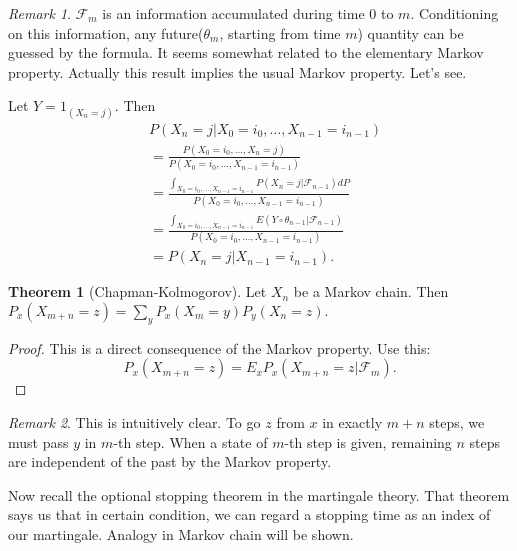 \documentclass{memoir}
\theoremstyle{definition}
\newtheorem{theorem}[definition]{Theorem}
\theoremstyle{remark}
\newtheorem*{remark}{Remark}
\begin{document}
\begin{remark}
	$\mathcal{F}_m$ is an information accumulated during time $0$ to $m$.
	Conditioning on this information, any future($\theta_m$, starting from time $m$) quantity can be guessed by the formula.
	It seems somewhat related to the elementary Markov property.
	Actually this result implies the usual Markov property.
	Let's see.

	Let $Y = 1_{(X_n = j)}$.
	Then
	\[
		\begin{split}
			&P\left( X_n = j \lvert X_0 = i_0, \dots, X_{n-1} = i_{n-1} \right)\\
			&= \frac{P\left( X_0 = i_0, \dots, X_n = j \right)}{P\left( X_0 = i_0, \dots, X_{n-1} = i_{n-1} \right)}\\
			&= \frac{\int_{X_0 = i_0, \dots, X_{n-1} = i_{n-1}}P\left( X_n = j \lvert \mathcal{F}_{n-1} \right)dP}{P\left( X_0 = i_0, \dots, X_{n-1} = i_{n-1} \right)} \\
			&= \frac{\int_{X_0 = i_0, \dots, X_{n-1} = i_{n-1}}E\left (Y\circ \theta_{n-1} \lvert \mathcal{F}_{n-1}\right )}{P(X_0 = i_0, \dots, X_{n-1} = i_{n-1})} \\
			&=  P\left( X_n =j \lvert X_{n-1} = i_{n-1} \right).
		\end{split}
	\]
	\label{<+label+>}
\end{remark}

\begin{theorem}[Chapman-Kolmogorov]
	Let $X_n$ be a Markov chain.
	Then
	$P_x\left( X_{m+n} = z \right) = \sum_{y}P_x\left( X_m = y \right)P_y\left( X_n = z \right).$
	\label{ChapmanKolmogorov}
\end{theorem}

\begin{proof}
	This is a direct consequence of the Markov property.
	Use this:
	\[
		P_x(X_{m+n} = z) = E_x P_x\left( X_{m+n} = z \lvert \mathcal{F}_m \right).
	\]
\end{proof}

\begin{remark}
	This is intuitively clear.
	To go $z$ from $x$ in exactly $m+n$ steps, we must pass $y$ in $m$-th step.
	When a state of $m$-th step is given, remaining $n$ steps are independent of the past by the Markov property.
	\label{<+label+>}
\end{remark}

Now recall the optional stopping theorem in the martingale theory.
That theorem says us that in certain condition, we can regard a stopping time as an index of our martingale.
Analogy in Markov chain will be shown.
\end{document}
